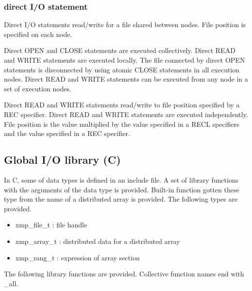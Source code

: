    \subsubsection{direct I/O statement}

   Direct I/O statements read/write for a file shared between nodes.
   File position is specified on each node.

   Direct OPEN and CLOSE statements are executed collectively. Direct
   READ and WRITE statements are executed locally.
   The file connected by direct OPEN statements is disconnected by using
   atomic CLOSE statements in all execution nodes.
   Direct READ and WRITE statements can be executed from any node in a
   set of execution nodes.
   
   Direct READ and WRITE statements read/write to file position
   specified by a REC specifier.
   Direct READ and WRITE statements are executed independently.
   File position is the value multiplied by the value specified in a RECL
   specifiers and the value specified in a REC specifier.


   \subsection{Global I/O library (C)}

   In C, some of data types is defined in an include file.
   A set of library functions with the arguments of the data type is
   provided.
   Built-in function gotten these type from the name of a distributed
   array is provided.
   The following types are provided.

   \begin{itemize}
    \item xmp\_file\_t : file handle
    \item xmp\_array\_t : distributed data for a distributed
	  array
    \item xmp\_rang\_t : expression of array section
   \end{itemize}

   The following library functions are provided.
   Collective function names end with \_all.

